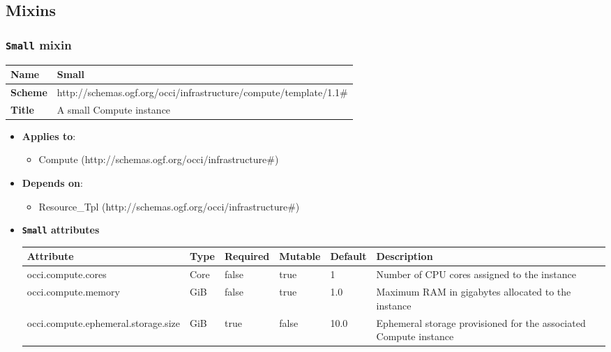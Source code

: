 \subsection{Mixins}
\subsubsection{\texttt{Small} mixin}
\begin{center}
\begin{tabular}{|l|l|}
  \hline
  \textbf{Name} & Small \\
  \hline  
  \textbf{Scheme} & http://schemas.ogf.org/occi/infrastructure/compute/template/1.1\# \\
  \hline
  \textbf{Title} & A small Compute instance \\
  \hline
\end{tabular}
\end{center}
\begin{itemize}
\item \textbf{Applies to}:
\begin{itemize}
	\item Compute (http://schemas.ogf.org/occi/infrastructure\#)
\end{itemize}
\end{itemize} 
\begin{itemize}
\item \textbf{Depends on}:
\begin{itemize}
	\item Resource\_Tpl (http://schemas.ogf.org/occi/infrastructure\#)
\end{itemize}
\end{itemize}

\begin{itemize}
\item \textbf{\texttt{Small} attributes}

\begin{tabularx}{\textwidth}{|l|l|p{1.4cm}|p{1.3cm}|l|X|}
  \hline
  \textbf{Attribute} & \textbf{Type} & \textbf{Required} & \textbf{Mutable} & \textbf{Default} & \textbf{Description} \\
  \hline  
  occi.compute.cores & Core & false & true & 1 & Number of CPU cores assigned to the instance \\
  \hline
  occi.compute.memory & GiB & false & true & 1.0 & Maximum RAM in gigabytes allocated to the instance \\
  \hline
  occi.compute.ephemeral.storage.size & GiB & true & false & 10.0 & Ephemeral storage provisioned for the associated Compute instance \\
  \hline
\end{tabularx}
\end{itemize}


